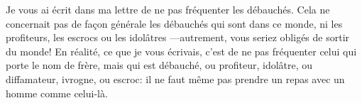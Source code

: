 Je vous ai écrit dans ma lettre de ne pas fréquenter les débauchés.
Cela ne concernait pas de façon générale les débauchés qui sont dans ce monde,
	ni les profiteurs, les escrocs ou les idolâtres
	---autrement, vous seriez obligés de sortir du monde!
En réalité, ce que je vous écrivais,
	c’est de ne pas fréquenter celui qui porte le nom de frère,
	mais qui est débauché, ou profiteur,
	idolâtre, ou diffamateur, ivrogne, ou escroc:
	il ne faut même pas prendre un repas avec un homme comme celui-là.
